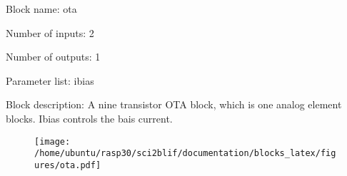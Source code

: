 \pagebreak

Block name: ota

Number of inputs: 2

Number of outputs: 1

Parameter list: ibias

Block description: 
A nine transistor OTA block, which is one analog element blocks. Ibias controls the bais current.

\begin{figure}[H]  %
\texttt{[image: /home/ubuntu/rasp30/sci2blif/documentation/blocks\_latex/figures/ota.pdf]}
\end{figure}

